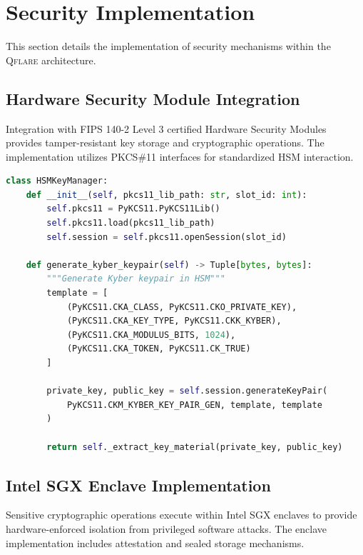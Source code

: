 \documentclass[12pt,a4paper,twoside]{book}
\newcommand{\qflare}{\textsc{Qflare}}
\begin{document}
\section{Security Implementation}
\label{sec:security-implementation}

This section details the implementation of security mechanisms within the \qflare{} architecture.

\subsection{Hardware Security Module Integration}
\label{subsec:hsm-integration}

Integration with FIPS 140-2 Level 3 certified Hardware Security Modules provides tamper-resistant key storage and cryptographic operations. The implementation utilizes PKCS\#11 interfaces for standardized HSM interaction.

\begin{lstlisting}[language=Python, caption=HSM Key Generation Interface, label=lst:hsm-keygen]
class HSMKeyManager:
    def __init__(self, pkcs11_lib_path: str, slot_id: int):
        self.pkcs11 = PyKCS11.PyKCS11Lib()
        self.pkcs11.load(pkcs11_lib_path)
        self.session = self.pkcs11.openSession(slot_id)
    
    def generate_kyber_keypair(self) -> Tuple[bytes, bytes]:
        """Generate Kyber keypair in HSM"""
        template = [
            (PyKCS11.CKA_CLASS, PyKCS11.CKO_PRIVATE_KEY),
            (PyKCS11.CKA_KEY_TYPE, PyKCS11.CKK_KYBER),
            (PyKCS11.CKA_MODULUS_BITS, 1024),
            (PyKCS11.CKA_TOKEN, PyKCS11.CK_TRUE)
        ]
        
        private_key, public_key = self.session.generateKeyPair(
            PyKCS11.CKM_KYBER_KEY_PAIR_GEN, template, template
        )
        
        return self._extract_key_material(private_key, public_key)
\end{lstlisting}

\subsection{Intel SGX Enclave Implementation}
\label{subsec:sgx-implementation}

Sensitive cryptographic operations execute within Intel SGX enclaves to provide hardware-enforced isolation from privileged software attacks. The enclave implementation includes attestation and sealed storage mechanisms.
\end{document}
